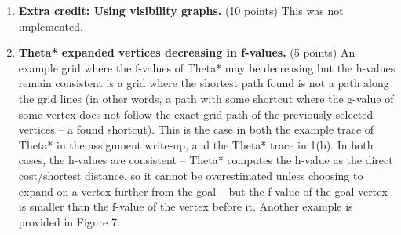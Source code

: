 \documentclass[12pt]{article}
\begin{document}
\begin{enumerate}[label=(\alph*)]
  \item \textbf{Extra credit: Using visibility graphs.} (10 points) This was not implemented.

  \item \textbf{Theta* expanded vertices decreasing in f-values.} (5 points) An example grid where the f-values of Theta* may be decreasing but the h-values remain consistent is a grid where the shortest path found is not a path along the grid lines (in other words, a path with some shortcut where the g-value of some vertex does not follow the exact grid path of the previously selected vertices -- a found shortcut). This is the case in both the example trace of Theta* in the assignment write-up, and the Theta* trace in 1(b). In both cases, the h-values are consistent -- Theta* computes the h-value as the direct cost/shortest distance, so it cannot be overestimated unless choosing to expand on a vertex further from the goal -- but the f-value of the goal vertex is smaller than the f-value of the vertex before it. Another example is provided in Figure 7.


\end{enumerate}
\end{document}
